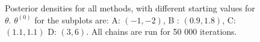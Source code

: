 \begin{figure}[ht]
    \caption{Posterior densities for all methods, with different starting values for $\theta$.  $\theta^{\left(0\right)}$ for the subplots are:   A: $(-1, -2)$, B : $(0.9, 1.8)$, C: $(1.1, 1.1)$ D: $(3, 6)$. All chains are run for 50 000 iterations.}%
    \label{fig:density_50k_02_06}%
\end{figure}




